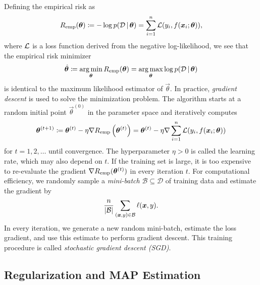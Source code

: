 Defining the empirical risk as
\begin{equation*}
  R_{\textup{emp}}(\bm{\theta}) \coloneqq - \log p(\mathcal{D} \,|\, \bm{\theta}) = \sum_{i=1}^{n} \mathcal{L}(y_i, f(\bm{x}_i; \bm{\theta})),
\end{equation*}
where $\mathcal{L}$ is a loss function derived from the negative log-likelihood, we see that the empirical risk minimizer
\begin{equation*}
  \hat{\bm{\theta}} \coloneqq \operatorname*{\arg\min}_{\bm{\theta}} R_{\textup{emp}}(\bm{\theta}) = \operatorname*{\arg\max}_{\bm{\theta}} \log p(\mathcal{D} \,|\, \bm{\theta})
\end{equation*}
is identical to the maximum likelihood estimator of $\vec{\theta}$. In practice, \emph{gradient descent} is used to solve the minimization problem. The algorithm starts at a random initial point $\vec{\theta}^{(0)}$ in the parameter space and iteratively computes
\begin{equation*}
  \bm{\theta}^{(t+1)} \coloneqq \bm{\theta}^{(t)} - \eta \nabla R_{\textup{emp}}\left( \bm{\theta}^{(t)} \right) = \bm{\theta}^{(t)} - \eta \nabla \sum_{i=1}^{n} \mathcal{L}(y_i, f(\bm{x}_i; \bm{\theta}))
\end{equation*}
for $t = 1,2,\dots$ until convergence. The hyperparameter $\eta > 0$ is called the learning rate, which may also depend on $t$. If the training set is large, it is too expensive to re-evaluate the gradient $\nabla R_{\textup{emp}}(\bm{\theta}^{(t)})$ in every iteration $t$. For computational efficiency, we randomly sample a \emph{mini-batch} $\mathcal{B} \subseteq \mathcal{D}$ of training data and estimate the gradient by
\begin{equation*}
  \frac{n}{\left\vert \mathcal{B} \right\vert} \sum_{(\bm{x}, y) \in \mathcal{B}} \ell(\bm{x}, y).
\end{equation*}
In every iteration, we generate a new random mini-batch, estimate the loss gradient, and use this estimate to perform gradient descent. This training procedure is called \emph{stochastic gradient descent (SGD)}.

\subsection{Regularization and MAP Estimation}
\label{sec:regularization}

